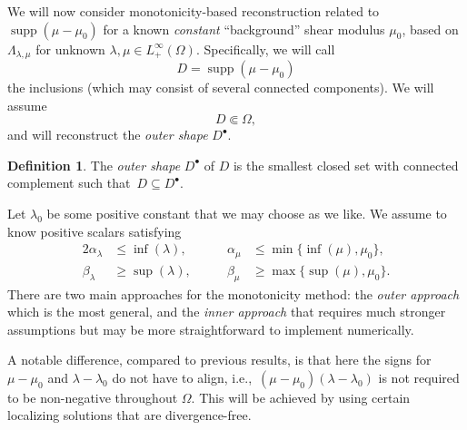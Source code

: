 \documentclass[reqno]{amsart}
\numberwithin{equation}{section}
\numberwithin{figure}{section}
\numberwithin{table}{section}
\newcommand\supp{\operatorname{supp}}
\theoremstyle{definition}
\theoremstyle{plain}
\theoremstyle{definition}
\newtheorem{defn}[thm]{Definition}
\theoremstyle{remark}
\numberwithin{equation}{section}
\begin{document}
We will now consider monotonicity-based reconstruction related to $\supp(\mu-\mu_0)$ for a known \emph{constant} ``background'' shear modulus $\mu_0$, based on $\Lambda_{\lambda,\mu}$ for unknown $\lambda,\mu\in
L^\infty_+(\Omega)$. Specifically, we will call
%
\begin{equation*}
	D = \supp(\mu-\mu_0)
\end{equation*} 
%
the inclusions (which may consist of several connected components). We will assume
%
\begin{equation*}
	D \Subset \Omega,
\end{equation*}
%
and will reconstruct the \emph{outer shape} $D^\bullet$.
%
\begin{defn}
	The \emph{outer shape} $D^\bullet$ of $D$ is the smallest closed set with connected complement such that~$D\subseteq D^\bullet$. 
\end{defn}
%
Let $\lambda_0$ be some positive constant that we may choose as we like. We assume to know positive scalars satisfying
%
\begin{alignat*}{2}
	\alpha_\lambda &\leq \inf(\lambda), &\qquad \alpha_\mu &\leq \min\{\inf(\mu),\mu_0\}, \\
	\beta_\lambda &\geq \sup(\lambda), &\qquad \beta_\mu &\geq \max\{\sup(\mu),\mu_0\}.
\end{alignat*}
%
There are two main approaches for the monotonicity method: the \emph{outer approach} which is the most general, and the \emph{inner approach} that requires much stronger assumptions but may be more straightforward to implement numerically. 

A notable difference, compared to previous results, is that here the signs for $\mu-\mu_0$ and $\lambda-\lambda_0$ do not have to align, i.e.,~$(\mu-\mu_0)(\lambda-\lambda_0)$ is not required to be non-negative throughout $\Omega$. This will be achieved by using certain localizing solutions that are divergence-free.
\end{document}
